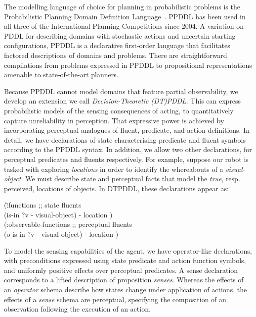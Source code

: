 
The modelling language of choice for planning in probabilistic
problems is the Probabilistic Planning Domain Definition
Language~\cite{younes:littman:04,younes:etal:2005}. PPDDL has been
used in all three of the International Planning Competitions since
2004. A variation on PDDL for describing domains with stochastic
actions and uncertain starting configurations, PPDDL is a declarative
first-order language that facilitates factored descriptions of domains
and problems. There are straightforward compilations from problems
expressed in PPDDL to propositional representations amenable
to state-of-the-art planners.

Because PPDDL cannot model domains that feature partial observability,
we develop an extension we call {\em Decision-Theoretic
(DT)PDDL}. This can express probabilistic models of the sensing
consequences of acting, to quantitatively capture unreliability in
perception. That expressive power is achieved by incorporating
perceptual analogues of fluent, predicate, and action definitions. In
detail, we have declarations of state characterising predicate and
fluent symbols according to the PPDDL syntax. In addition, we allow
two other declarations, for perceptual predicates and fluents
respectively. For example, suppose our robot is tasked with exploring
{\em locations} in order to identify the whereabouts of a {\em
visual-object}. We must describe state and perceptual facts that model
the {\em true}, resp. perceived, locations of objects. In DTPDDL,
these declarations appear as:

\small
\begin{tabtt}
(\=:functions  ;; state fluents\\
  \> (is-in ?v - visual-object) - location )\\
(:observable-functions  ;; perceptual fluents\\
  \> (o-is-in ?v - visual-object) - location )
\end{tabtt}
\normalsize

\noindent To model the sensing capabilities of the agent, we have
operator-like declarations, with preconditions expressed using state
predicate and action function symbols, and uniformly positive effects
over perceptual predicates. A sense declaration corresponds to a
lifted description of proposition {\em senses}. Whereas the effects of
an {\em operator} schema describe how states change under application
of actions, the effects of a {\em sense} schema are perceptual,
specifying the composition of an observation following the execution
of an action. 

